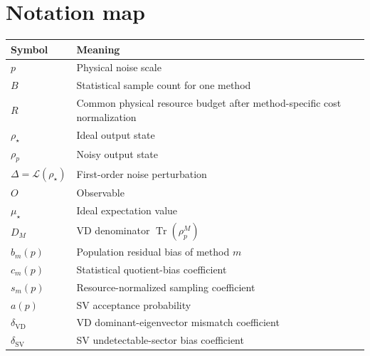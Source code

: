 \documentclass[11pt]{article}
\DeclareMathOperator{\Tr}{Tr}
\newcommand{\1}{\mathbf{1}}
\begin{document}
\section{Notation map}

\begin{center}
\begin{tabular}{ll}
\toprule
Symbol & Meaning\\
\midrule
\(p\) & Physical noise scale\\
\(B\) & Statistical sample count for one method\\
\(R\) & Common physical resource budget after method-specific cost normalization\\
\(\rho_\star\) & Ideal output state\\
\(\rho_p\) & Noisy output state\\
\(\Delta=\mathcal L(\rho_\star)\) & First-order noise perturbation\\
\(O\) & Observable\\
\(\mu_\star\) & Ideal expectation value\\
\(D_M\) & VD denominator \(\Tr(\rho_p^M)\)\\
\(b_m(p)\) & Population residual bias of method \(m\)\\
\(c_m(p)\) & Statistical quotient-bias coefficient\\
\(s_m(p)\) & Resource-normalized sampling coefficient\\
\(a(p)\) & SV acceptance probability\\
\(\delta_{\mathrm{VD}}\) & VD dominant-eigenvector mismatch coefficient\\
\(\delta_{\mathrm{SV}}\) & SV undetectable-sector bias coefficient\\
\bottomrule
\end{tabular}
\end{center}
\end{document}
